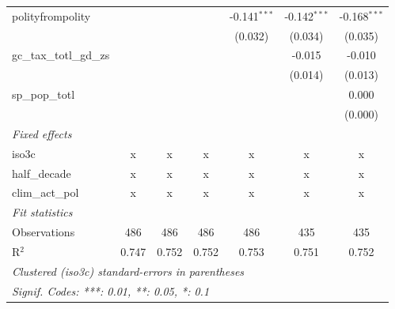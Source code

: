 \begin{tabular}{lcccccc}
   polityfrompolity                                    &               &                &                & -0.141$^{***}$ & -0.142$^{***}$ & -0.168$^{***}$\\   
                                                       &               &                &                & (0.032)        & (0.034)        & (0.035)\\   
   gc\_tax\_totl\_gd\_zs                               &               &                &                &                & -0.015         & -0.010\\   
                                                       &               &                &                &                & (0.014)        & (0.013)\\   
   sp\_pop\_totl                                       &               &                &                &                &                & 0.000\\   
                                                       &               &                &                &                &                & (0.000)\\   
   \emph{Fixed effects}\\
   iso3c                                               & x             & x              & x              & x              & x              & x\\  
   half\_decade                                        & x             & x              & x              & x              & x              & x\\  
   clim\_act\_pol                                      & x             & x              & x              & x              & x              & x\\  
   \midrule \emph{Fit statistics}\\
   Observations                                        & 486           & 486            & 486            & 486            & 435            & 435\\  
   R$^2$                                               & 0.747         & 0.752          & 0.752          & 0.753          & 0.751          & 0.752\\  
   \midrule
   \multicolumn{7}{l}{\emph{Clustered (iso3c) standard-errors in parentheses}}\\
   \multicolumn{7}{l}{\emph{Signif. Codes: ***: 0.01, **: 0.05, *: 0.1}}\\
\end{tabular}
\par\endgroup


